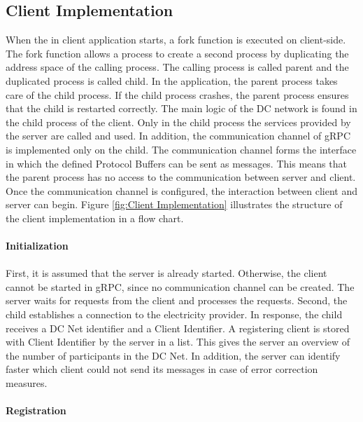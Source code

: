 \subsection{Client Implementation}
When the in client application starts, a fork function is executed on client-side. The fork function allows a process to create a second process by duplicating the address space of the calling process. The calling process is called parent and the duplicated process is called child. In the application, the parent process takes care of the child process. If the child process crashes, the parent process ensures that the child is restarted correctly. The main logic of the DC network is found in the child process of the client. Only in the child process the services provided by the server are called and used. In addition, the communication channel of gRPC is implemented only on the child. The communication channel forms the interface in which the defined Protocol Buffers can be sent as messages. This means that the parent process has no access to the communication between server and client. Once the communication channel is configured, the interaction between client and server can begin. Figure \ref{fig:Client Implementation} illustrates the structure of the client implementation in a flow chart.
\\
\\
\textbf{Initialization}
\\
\\
First, it is assumed that the server is already started. Otherwise, the client cannot be started in gRPC, since no communication channel can be created. The server waits for requests from the client and processes the requests. Second, the child establishes a connection to the electricity provider. In response, the child receives a DC Net identifier and a Client Identifier. A registering client is stored with Client Identifier by the server in a list. This gives the server an overview of the number of participants in the DC Net. In addition, the server can identify faster which client could not send its messages in case of error correction measures. \\
\\
\textbf{Registration}
\\
\\
